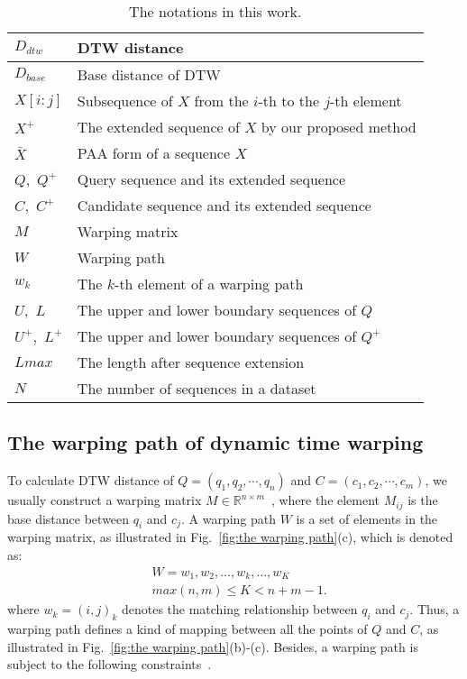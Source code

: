 \documentclass[10pt,journal,compsoc]{IEEEtran}
\begin{document}
\begin{table}[H]
\centering
\caption{The notations in this work.}\label{tab:notations}
\begin{tabular}{p{1.2cm}<{\centering}|p{6.5cm}<{\centering}}
\hline
$D_{dtw}$             &  DTW distance \\ \hline
$D_{base}$            &  Base distance of DTW \\ \hline
$X[i:j]$              &  Subsequence of $X$ from the $i$-th to the $j$-th element  \\ \hline
$X^+$                 &  The extended sequence of $X$ by our proposed method  \\ \hline
$\bar{X}$             &  PAA form of a sequence $X$  \\ \hline
$Q$,\ $Q^+$           &  Query sequence and its extended sequence \\ \hline
$C$,\ $C^+$           &  Candidate sequence and its extended sequence \\ \hline
$M$                   &  Warping matrix \\ \hline
$W$                   &  Warping path \\ \hline
$w_k$                 &  The $k$-th element of a warping path \\ \hline
$U$,\ $L$             &  The upper and lower boundary sequences of $Q$  \\ \hline
$U^+$,\ $L^+$         &  The upper and lower boundary sequences of $Q^+$  \\ \hline
$Lmax$                &  The length after sequence extension  \\ \hline
$N$                   &  The number of sequences in a dataset \\ \hline
\end{tabular}
\end{table}




\subsection{The warping path of dynamic time warping}

To calculate DTW distance of $Q=(q_1,q_2,\cdots,q_n)$ and $C=(c_1,c_2,\cdots,c_m)$,
we usually construct a warping matrix $M \in \mathbb{R}^{n \times m}$~\cite{Salvador2007Toward},
where the element $M_{ij}$ is the base distance between $q_i$ and $c_j$.
A warping path $W$ is a set of elements in the warping matrix, as illustrated in Fig.~\ref{fig:the warping path}(c),
which is denoted as:
\begin{equation}\label{eq:warping path}
\begin{split}
    & W=w_1, w_2, \ldots, w_k, \ldots, w_K \\
    & max(n,m)\leq K < n+m-1.
\end{split}
\end{equation}
where $w_k=(i,j)_k$ denotes the matching relationship between $q_i$ and $c_j$.
Thus, a warping path defines a kind of mapping between all the points of $Q$ and $C$,
as illustrated in Fig.~\ref{fig:the warping path}(b)-(c).
Besides, a warping path is subject to the following constraints~\cite{Morel2017Time}.
\end{document}
